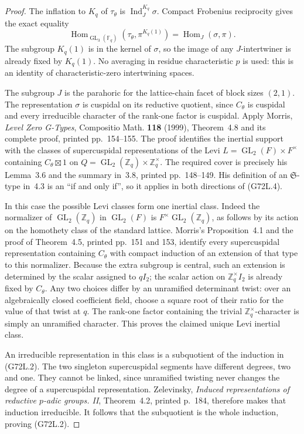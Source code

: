 \begin{proof}
The inflation to $K_q$ of $\tau_\theta$ is
$\operatorname{Ind}_{J}^{K_q}\sigma$.  Compact Frobenius
reciprocity gives the exact equality
\[
 \operatorname{Hom}_{\operatorname{GL}_3(\mathbb F_q)}
            (\tau_\theta,\pi^{K_q(1)})
              =\operatorname{Hom}_{J}(\sigma,\pi).           \tag{G72L.4}
\]
The subgroup $K_q(1)$ is in the kernel of $\sigma$, so the
image of any $J$-intertwiner is already fixed by $K_q(1)$.
No averaging in residue characteristic $p$ is used: this is
an identity of characteristic-zero intertwining spaces.

The subgroup $J$ is the parahoric for the lattice-chain facet
of block sizes $(2,1)$.  The representation $\sigma$ is
cuspidal on its reductive quotient, since $C_\theta$ is
cuspidal and every irreducible character of the rank-one
factor is cuspidal.  Apply Morris, \emph{Level Zero
G-Types}, Compositio Math. \textbf{118} (1999), Theorem~4.8
and its complete proof, printed pp.~154--155.  The proof
identifies the inertial support with the classes of
supercuspidal representations of the Levi
$L=\operatorname{GL}_2(F)\times F^\times$ containing
$C_\theta\boxtimes1$ on
$Q=\operatorname{GL}_2(\mathbb Z_q)\times\mathbb Z_q^\times$.
The required cover is precisely his Lemma~3.6 and the summary
in~3.8, printed pp.~148--149.  His definition of an
$\mathfrak S$-type in~4.3 is an ``if and only if'', so it
applies in both directions of (G72L.4).

In this case the possible Levi classes form one inertial
class.  Indeed the normalizer of
$\operatorname{GL}_2(\mathbb Z_q)$ in $\operatorname{GL}_2(F)$
is $F^\times\operatorname{GL}_2(\mathbb Z_q)$, as follows
by its action on the homothety class of the standard lattice.
Morris's Proposition~4.1 and the proof of Theorem~4.5,
printed pp.~151 and 153, identify every supercuspidal
representation containing $C_\theta$ with compact induction
of an extension of that type to this normalizer.  Because the
extra subgroup is central, such an extension is determined by
the scalar assigned to $qI_2$; the scalar action on
$\mathbb Z_q^\times I_2$ is already fixed by $C_\theta$.
Any two choices differ by an unramified determinant twist:
over an algebraically closed coefficient field, choose a
square root of their ratio for the value of that twist at
$q$.  The rank-one factor containing the trivial
$\mathbb Z_q^\times$-character is simply an unramified
character.  This proves the claimed unique Levi inertial
class.

An irreducible representation in this class is a subquotient
of the induction in (G72L.2).  The two singleton supercuspidal
segments have different degrees, two and one.  They cannot
be linked, since unramified twisting never changes the
degree of a supercuspidal representation.  Zelevinsky,
\emph{Induced representations of reductive $p$-adic groups.
II}, Theorem~4.2, printed p.~184, therefore makes that
induction irreducible.  It follows that the subquotient is
the whole induction, proving (G72L.2).


\end{proof}
